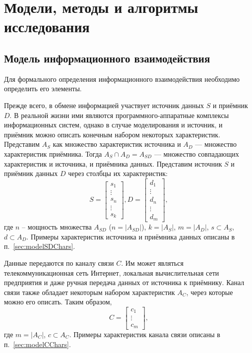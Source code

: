 \section{Модели, методы и алгоритмы исследования}

\subsection{Модель информационного взаимодействия}

Для формального определения информационного взаимодействия необходимо определить его элементы.

Прежде всего, в обмене информацией участвует источник данных $S$ и приёмник $D$.
В реальной жизни ими являются программного-аппаратные комплексы информационных систем, однако в случае моделирования и источник, и приёмник можно описать конечным набором некоторых характеристик.
Представим $A_S$ как множество характеристик источника и $A_D$ --- множество характеристик приёмника.
Тогда $A_S \cap A_D = A_{SD}$ --- множество совпадающих характеристик и источника, и приёмника данных.
Представим источник $S$ и приёмник данных $D$ через столбцы их характеристик:
$$S = \begin{bmatrix}
s_{1} \\
\vdots \\
s_{n} \\         
\vdots \\
s_{k}
\end{bmatrix},
D = \begin{bmatrix}
d_{1} \\
\vdots \\
d_{n} \\         
\vdots \\
d_{m}
\end{bmatrix},$$
где $n$ -- мощность множества $A_{SD}$ ($n = |A_{SD}|$), $k = |A_S|$, $m = |A_D|$, $s \subset A_S$, $d \subset A_D$.
Примеры характеристик источника и приёмника данных описаны в п.~\ref{sec:modelSDChars}.

Данные передаются по каналу связи $C$.
Им может являться телекоммуникационная сеть Интернет, локальная вычислительная сети предприятия и даже ручная передача данных от источника к приёмнику.
Канал связи также обладает некоторым набором характеристик $A_C$, через которые можно его описать.
Таким образом,
$$
C = \begin{bmatrix}
c_{1} \\
\vdots \\
c_{m}
\end{bmatrix},
$$
где $m = |A_C|$, $c \subset A_C$.
Примеры характеристик канала связи описаны в п.~\ref{sec:modelCChars}.


